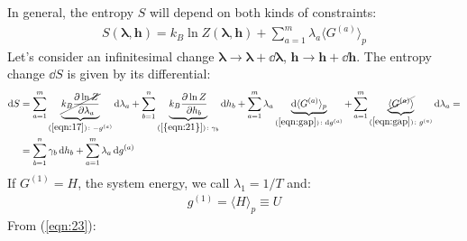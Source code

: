 \documentclass[../template.tex]{subfiles}
\begin{document}
In general, the entropy $S$ will depend on both kinds of constraints:
\begin{align}\label{eqn:22}
    S(\bm{\lambda}, \bm{h}) = k_B \ln Z(\bm{\lambda}, \bm{h}) + \sum_{a=1}^m \lambda_a \langle G^{(a)} \rangle_p
\end{align}
Let's consider an infinitesimal change $\bm{\lambda} \to \bm{\lambda} +\dd{\bm{\lambda}}$, $\bm{h} \to \bm{h} + \dd{\bm{h}}$. The entropy change $\dd{S}$ is given by its differential:
\begin{align}\label{eqn:23}
    \dd{S} &= \sum_{a=1}^m \underbrace{\cancel{k_B \pdv{\ln Z}{\lambda_a}}}_{(\ref{eqn:17})\colon -g^{(a)}} \dd{\lambda_a} + \sum_{b=1}^n \underbrace{k_B \pdv{\ln Z}{h_b}}_{(\ref{{eqn:21}})\colon \gamma_b} \dd{h_b} + \sum_{a=1}^m \lambda_a \underbrace{\dd{\langle G^{(a)} \rangle_p}}_{(\ref{eqn:gap}) \colon \dd{g^{(a)}}} + \sum_{a=1}^m \underbrace{\cancel{\langle G^{(a)} \rangle}}_{(\ref{eqn:gap})\colon g^{(a)}}\dd{\lambda_a} =\\ \nonumber
    &= \sum_{b=1}^n \gamma_b \dd{h_b} + \sum_{a=1}^m \lambda_a \dd{g^{(a)}}
\end{align}
If $G^{(1)} = H$, the system energy, we call $\lambda_1 = 1/T$ and:
\begin{align}\label{eqn:24}
    g^{(1)} = \langle H \rangle_p \equiv U
\end{align}
From (\ref{eqn:23}):
\end{document}
